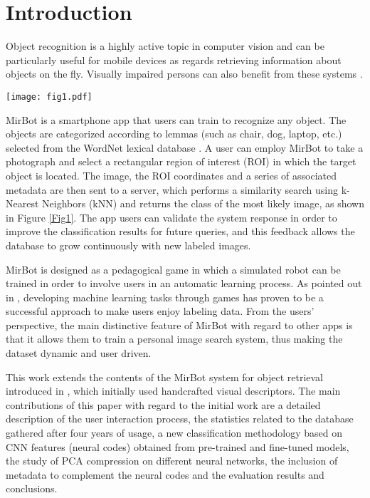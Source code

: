 \documentclass[final, twocolumn]{elsarticle}
\begin{document}
\ifarxiv
\else
\linenumbers
\fi


\section{Introduction}

Object recognition is a highly active topic in computer vision and can be particularly useful for mobile devices \citep{Bock2010IImage:IPhone, mobilenets} as regards retrieving information about objects on the fly. Visually impaired persons can also benefit from these systems \citep{Matusiak2013ObjectUsers}.

\begin{figure*}%
\centering
\texttt{[image: fig1.pdf]}
\caption{\label{Fig1} Architecture of the iOS app. This example corresponds to the longest user interaction sequence. }
\end{figure*}

MirBot is a smartphone app that users can train to recognize any object. The objects are categorized according to lemmas (such as chair, dog, laptop, etc.) selected from the WordNet lexical database \citep{Fellbaum1998WordNet:Database}. A user can employ MirBot to take a photograph and select a rectangular region of interest (ROI) in which the target object is located. The image, the ROI coordinates and a series of associated metadata are then sent to a server, which performs a similarity search using k-Nearest Neighbors (kNN) and returns the class of the most likely image, as shown in Figure \ref{Fig1}. The app users can validate the system response in order to improve the classification results for future queries, and this feedback allows the database to grow continuously with new labeled images.

MirBot is designed as a pedagogical game in which a simulated robot can be trained in order to involve users in an automatic learning process. As pointed out in \cite{Barrington2012Game-poweredLearning.,vonAhn2004LabelingGame}, developing machine learning tasks through games has proven to be a successful approach to make users enjoy labeling data. From the users' perspective, the main distinctive feature of MirBot with regard to other apps is that it allows them to train a personal image search system, thus making the dataset dynamic and user driven.

This work extends the contents of the MirBot system for object retrieval introduced in \cite{MirBot:System}, which initially used handcrafted visual descriptors. The main contributions of this paper with regard to the initial work are a detailed description of the user interaction process, the statistics related to the database gathered after four years of usage, a new classification methodology based on CNN features (neural codes) obtained from pre-trained and fine-tuned models, the study of PCA compression on different neural networks, the inclusion of metadata to complement the neural codes and the evaluation results and conclusions.
\end{document}
